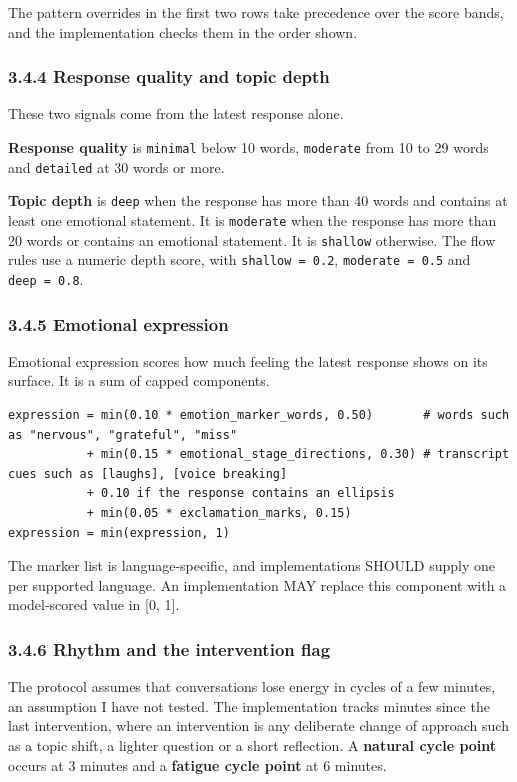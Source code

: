 \documentclass[11pt]{article}
\begin{document}
The pattern overrides in the first two rows take precedence over the
score bands, and the implementation checks them in the order shown.

\subsubsection{3.4.4 Response quality and topic depth}

These two signals come from the latest response alone.

\textbf{Response quality} is \texttt{minimal} below 10 words,
\texttt{moderate} from 10 to 29 words and \texttt{detailed} at 30 words
or more.

\textbf{Topic depth} is \texttt{deep} when the response has more than 40
words and contains at least one emotional statement. It is
\texttt{moderate} when the response has more than 20 words or contains
an emotional statement. It is \texttt{shallow} otherwise. The flow rules
use a numeric depth score, with \texttt{shallow\ =\ 0.2},
\texttt{moderate\ =\ 0.5} and \texttt{deep\ =\ 0.8}.

\subsubsection{3.4.5 Emotional expression}

Emotional expression scores how much feeling the latest response shows
on its surface. It is a sum of capped components.

\begin{verbatim}
expression = min(0.10 * emotion_marker_words, 0.50)       # words such as "nervous", "grateful", "miss"
           + min(0.15 * emotional_stage_directions, 0.30) # transcript cues such as [laughs], [voice breaking]
           + 0.10 if the response contains an ellipsis
           + min(0.05 * exclamation_marks, 0.15)
expression = min(expression, 1)
\end{verbatim}

The marker list is language-specific, and implementations SHOULD supply
one per supported language. An implementation MAY replace this component
with a model-scored value in {[}0, 1{]}.

\subsubsection{3.4.6 Rhythm and the intervention flag}

The protocol assumes that conversations lose energy in cycles of a few
minutes, an assumption I have not tested. The implementation tracks
minutes since the last intervention, where an intervention is any
deliberate change of approach such as a topic shift, a lighter question
or a short reflection. A \textbf{natural cycle point} occurs at 3
minutes and a \textbf{fatigue cycle point} at 6 minutes.
\end{document}
